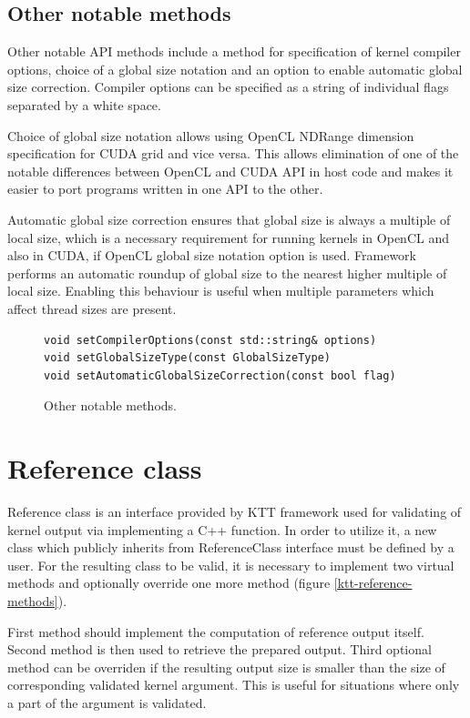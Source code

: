 \documentclass
[
    digital, %
    oneside, %
    table, %
    nolof, %
    nolot, %
    nocover %
]{fithesis3}
\begin{document}
\subsection{Other notable methods}
Other notable API methods include a method for specification of kernel compiler options, choice of a global size notation and an option to enable
automatic global size correction. Compiler options can be specified as a string of individual flags separated by a white space.

Choice of global size notation allows using OpenCL NDRange dimension specification for CUDA grid and vice versa. This allows elimination of one of the
notable differences between OpenCL and CUDA API in host code and makes it easier to port programs written in one API to the other.

Automatic global size correction ensures that global size is always a multiple of local size, which is a necessary requirement for running kernels
in OpenCL and also in CUDA, if OpenCL global size notation option is used. Framework performs an automatic roundup of global size to the nearest higher
multiple of local size. Enabling this behaviour is useful when multiple parameters which affect thread sizes are present.

\begin{figure}
\begin{lstlisting}
void setCompilerOptions(const std::string& options)
void setGlobalSizeType(const GlobalSizeType)
void setAutomaticGlobalSizeCorrection(const bool flag)
\end{lstlisting}
\caption{Other notable methods.}
\label{ktt-utility-methods}
\end{figure}

\section{Reference class}
Reference class is an interface provided by KTT framework used for validating of kernel output via implementing a C++ function. In order to utilize it,
a new class which publicly inherits from ReferenceClass interface must be defined by a user. For the resulting class to be valid, it is necessary to
implement two virtual methods and optionally override one more method (figure \ref{ktt-reference-methods}).

First method should implement the computation of reference output itself. Second method is then used to retrieve the prepared output. Third optional
method can be overriden if the resulting output size is smaller than the size of corresponding validated kernel argument. This is useful for situations
where only a part of the argument is validated.
\end{document}
